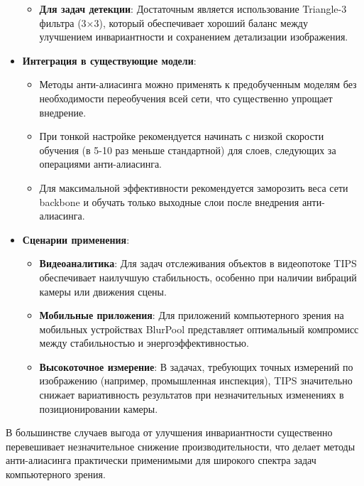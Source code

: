 \begin{itemize}
\begin{itemize}
        \item \textbf{Для задач детекции}: Достаточным является использование Triangle-3 фильтра (3×3), который обеспечивает хороший баланс между улучшением инвариантности и сохранением детализации изображения.
    \end{itemize}
    
    \item \textbf{Интеграция в существующие модели}:
    \begin{itemize}
        \item Методы анти-алиасинга можно применять к предобученным моделям без необходимости переобучения всей сети, что существенно упрощает внедрение.
        
        \item При тонкой настройке рекомендуется начинать с низкой скорости обучения (в 5-10 раз меньше стандартной) для слоев, следующих за операциями анти-алиасинга.
        
        \item Для максимальной эффективности рекомендуется заморозить веса сети backbone и обучать только выходные слои после внедрения анти-алиасинга.
    \end{itemize}
    
    \item \textbf{Сценарии применения}:
    \begin{itemize}
        \item \textbf{Видеоаналитика}: Для задач отслеживания объектов в видеопотоке TIPS обеспечивает наилучшую стабильность, особенно при наличии вибраций камеры или движения сцены.
        
        \item \textbf{Мобильные приложения}: Для приложений компьютерного зрения на мобильных устройствах BlurPool представляет оптимальный компромисс между стабильностью и энергоэффективностью.
        
        \item \textbf{Высокоточное измерение}: В задачах, требующих точных измерений по изображению (например, промышленная инспекция), TIPS значительно снижает вариативность результатов при незначительных изменениях в позиционировании камеры.
    \end{itemize}
\end{itemize}

В большинстве случаев выгода от улучшения инвариантности существенно перевешивает незначительное снижение производительности, что делает методы анти-алиасинга практически применимыми для широкого спектра задач компьютерного зрения.


